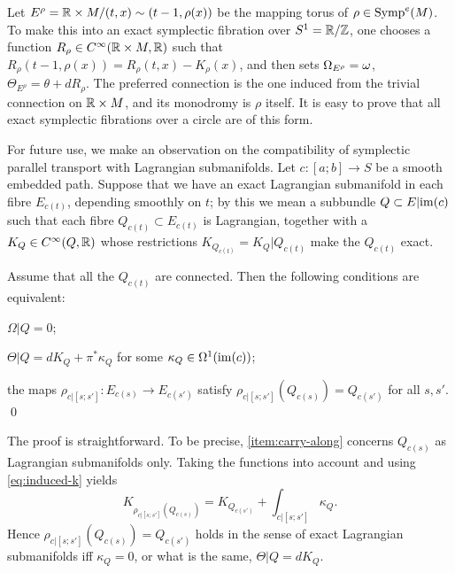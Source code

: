 \documentclass[10pt,letterpaper]{article}
\begin{document}
\begin{example} \label{ex:mapping-torus}
Let $E^\rho = \mathbb{R} \times M / (t,x) \sim (t-1,\rho(x))$ be the mapping
torus of $\rho \in \mathrm{Symp}^e(M)$. To make this into an exact symplectic
fibration over $S^1 = \mathbb{R}/\mathbb{Z}$, one chooses a function $R_\rho \in
C^\infty(\mathbb{R} \times M,\mathbb{R})$ such that $R_\rho(t-1,\rho(x)) = R_\rho(t,x)
- K_\rho(x)$, and then sets $\Omega_{E^\rho} = \omega$, $\Theta_{E^\rho}
= \theta + dR_\rho$. The preferred connection is the one induced from
the trivial connection on $\mathbb{R} \times M$, and its monodromy is $\rho$
itself. It is easy to prove that all exact symplectic fibrations over
a circle are of this form.
\end{example}

For future use, we make an observation on the compatibility of symplectic
parallel transport with Lagrangian submanifolds. Let $c: [a;b] \rightarrow S$
be a smooth embedded path. Suppose that we have an exact Lagrangian submanifold
in each fibre $E_{c(t)}$, depending smoothly on $t$; by this we mean a
subbundle $Q \subset E|\mathrm{im}(c)$ such that each fibre $Q_{c(t)} \subset E_{c(t)}$
is Lagrangian, together with a $K_Q \in C^\infty(Q,\mathbb{R})$ whose restrictions
$K_{Q_{c(t)}} = K_Q|Q_{c(t)}$ make the $Q_{c(t)}$ exact.

\begin{lemma} \label{th:submanifold}
Assume that all the $Q_{c(t)}$ are connected. Then the following conditions are
equivalent:
\begin{condensedlist}
\item
$\Omega|Q = 0$;
\item
$\Theta|Q = dK_Q + \pi^*\kappa_Q$ for some $\kappa_Q \in \Omega^1(\mathrm{im}(c))$;
\item \label{item:carry-along}
the maps $\rho_{c|[s;s']}: E_{c(s)} \rightarrow E_{c(s')}$ satisfy
$\rho_{c|[s;s']}(Q_{c(s)}) = Q_{c(s')}$ for all $s,s'$. \qed
\end{condensedlist}
\end{lemma}

The proof is straightforward. To be precise, \ref{item:carry-along} concerns
$Q_{c(s)}$ as Lagrangian submanifolds only. Taking the functions into account
and using \eqref{eq:induced-k} yields
\[
K_{\rho_{c|[s;s']}(Q_{c(s)})} = K_{Q_{c(s')}} + \int_{c|[s;s']} \kappa_Q.
\]
Hence $\rho_{c|[s;s']}(Q_{c(s)}) = Q_{c(s')}$ holds in the sense of exact
Lagrangian submanifolds iff $\kappa_Q = 0$, or what is the same, $\Theta|Q =
dK_Q$.
\end{document}
